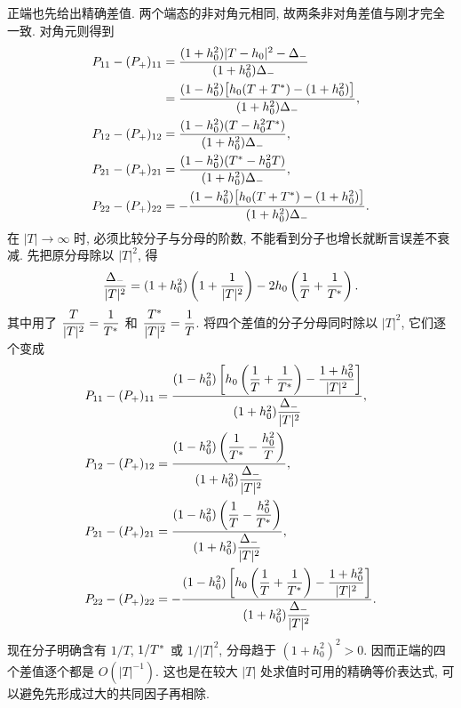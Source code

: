 \par\smallskip\noindent 正端也先给出精确差值.\quad
两个端态的非对角元相同, 故两条非对角差值与刚才完全一致. 对角元则得到
\begin{align*}
P_{11}-(P_+)_{11}
&=\dfrac{(1+h_0^2)|T-h_0|^2-\Delta_-}
{(1+h_0^2)\Delta_-}\\
&=\dfrac{(1-h_0^2)
\bigl[h_0(T+{T}^{*})-(1+h_0^2)\bigr]}
{(1+h_0^2)\Delta_-},\\
P_{12}-(P_+)_{12}
&=\dfrac{(1-h_0^2)(T-h_0^2{T}^{*})}
{(1+h_0^2)\Delta_-},\\
P_{21}-(P_+)_{21}
&=\dfrac{(1-h_0^2)({T}^{*}-h_0^2T)}
{(1+h_0^2)\Delta_-},\\
P_{22}-(P_+)_{22}
&=-\dfrac{(1-h_0^2)
\bigl[h_0(T+{T}^{*})-(1+h_0^2)\bigr]}
{(1+h_0^2)\Delta_-}.
\end{align*}
在 $|T|\to\infty$ 时, 必须比较分子与分母的阶数, 不能看到分子也增长就断言误差不衰减. 先把原分母除以 $|T|^2$, 得
\begin{equation*}
\dfrac{\Delta_-}{|T|^2}
=(1+h_0^2)\left(1+\dfrac{1}{|T|^2}\right)
-2h_0\left(\dfrac{1}{T}+\dfrac{1}{{T}^{*}}\right).
\end{equation*}
其中用了 $\dfrac{T}{|T|^2}=\dfrac{1}{{T}^{*}}$ 和 $\dfrac{{T}^{*}}{|T|^2}=\dfrac{1}{T}$. 将四个差值的分子分母同时除以 $|T|^2$, 它们逐个变成
\begin{align*}
P_{11}-(P_+)_{11}
&=\dfrac{(1-h_0^2)
\left[h_0\left(\dfrac{1}{T}+\dfrac{1}{{T}^{*}}\right)
-\dfrac{1+h_0^2}{|T|^2}\right]}
{(1+h_0^2)\dfrac{\Delta_-}{|T|^2}},\\
P_{12}-(P_+)_{12}
&=\dfrac{(1-h_0^2)
\left(\dfrac{1}{{T}^{*}}-\dfrac{h_0^2}{T}\right)}
{(1+h_0^2)\dfrac{\Delta_-}{|T|^2}},\\
P_{21}-(P_+)_{21}
&=\dfrac{(1-h_0^2)
\left(\dfrac{1}{T}-\dfrac{h_0^2}{{T}^{*}}\right)}
{(1+h_0^2)\dfrac{\Delta_-}{|T|^2}},\\
P_{22}-(P_+)_{22}
&=-\dfrac{(1-h_0^2)
\left[h_0\left(\dfrac{1}{T}+\dfrac{1}{{T}^{*}}\right)
-\dfrac{1+h_0^2}{|T|^2}\right]}
{(1+h_0^2)\dfrac{\Delta_-}{|T|^2}}.
\end{align*}
现在分子明确含有 $1/T$, $1/{T}^{*}$ 或 $1/|T|^2$, 分母趋于 $(1+h_0^2)^2>0$. 因而正端的四个差值逐个都是 $O(|T|^{-1})$. 这也是在较大 $|T|$ 处求值时可用的精确等价表达式, 可以避免先形成过大的共同因子再相除.

